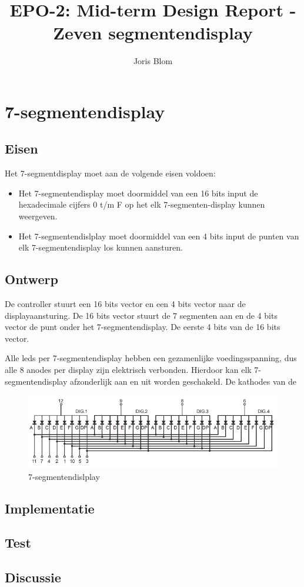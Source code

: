 \documentclass{report}
\title{EPO-2: Mid-term Design Report - Zeven segmentendisplay}
\author{Joris Blom}
\begin{document}
\chapter{7-segmentendisplay}
\label{ch:sseg}
\section{Eisen}
\label{sec:Eisen}
Het 7-segmentdisplay moet aan de volgende eisen voldoen: 
\begin{itemize}
\item Het 7-segmentendisplay moet doormiddel van een 16 bits input de hexadecimale cijfers 0 t/m F op het elk 7-segmenten-display kunnen weergeven.
\item Het 7-segmentendislplay moet doormiddel van een 4 bits input de punten van elk 7-segmentendisplay los kunnen aansturen.
\end{itemize}
\section{Ontwerp}
De controller stuurt een 16 bits vector en een 4 bits vector naar de displayaansturing. De 16 bits vector stuurt de 7 segmenten aan en de 4 bits vector de punt onder het 7-segmentendisplay. De eerste 4 bits van de 16 bits vector.

Alle leds per 7-segmentendisplay hebben een gezamenlijke voedingsspanning, dus alle 8 anodes per display zijn elektrisch verbonden. Hierdoor kan elk 7-segmentendisplay afzonderlijk aan en uit worden geschakeld. De kathodes van de 
\begin{figure}[H]
\centering
\includegraphics{7_segment_display_schematic.png}

\caption{7-segmentendislplay}
\end{figure}


\section{Implementatie}
\section{Test}
\section{Discussie}
\end{document}
